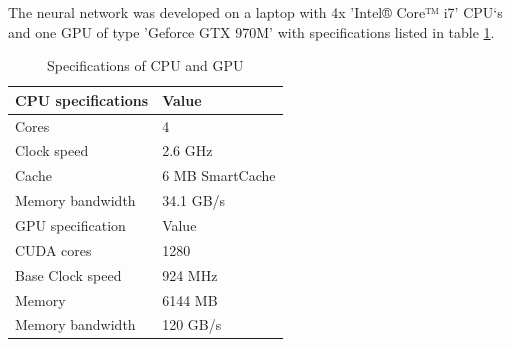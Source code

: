 
\noindent
The neural network was developed on a laptop with 4x 'Intel® Core™ i7' CPU‘s and one GPU of type 'Geforce GTX 970M' with specifications listed in table \ref{tab:Specs}.


\begin{table}[H]
\centering
\begin{tabular}{p{4cm}|p{4cm}}
\hline
CPU specifications &  Value \\ \hline
Cores & 4 \\
Clock speed & 2.6 GHz \\ 
Cache & 6 MB SmartCache  \\ 
Memory bandwidth & 34.1 GB/s \\ \hline
GPU specification & Value \\ \hline
CUDA cores & 1280  \\
Base Clock speed & 924 MHz  \\
Memory & 6144 MB  \\
Memory bandwidth & 120 GB/s  \\ \hline
\end{tabular}
\caption{Specifications of CPU and GPU \citep{Intel,Nvidia}}
\label{tab:Specs}
\end{table}

